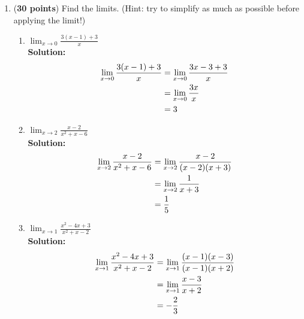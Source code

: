 \documentclass[a4paper]{article}
\begin{document}
\begin{enumerate}
\item (\textbf{30 points}) Find the limits. (Hint: try to simplify as much as possible before applying the limit!)

\begin{enumerate}
	\item $\lim_{x \to 0} \frac{3(x-1)+3}{x}$\\
	
	\textbf{Solution:}\\
	
\begin{align*}
	\lim_{x \to 0} \frac{3(x-1)+3}{x} &= \lim_{x \to 0} \frac{3x-3+3}{x}\notag\\
	&= \lim_{x \to 0} \frac{3x}{x}\notag\\
	&= 3\notag
\end{align*}	
	
	\item $\lim_{x \to 2} \frac{x-2}{x^2+x-6}$\\
	
	\textbf{Solution:}\\
	
\begin{align*}
	\lim_{x \to 2} \frac{x-2}{x^2+x-6} &= \lim_{x \to 2} \frac{x-2}{(x-2)(x+3)}\notag\\
	&= \lim_{x \to 2} \frac{1}{x+3}\notag\\
	&= \frac{1}{5}\notag
\end{align*}		
	
	
	\item $\lim_{x \to 1} \frac{x^2-4x+3}{x^2+x-2}$\\
	
	\textbf{Solution:}\\
	
\begin{align*}
	\lim_{x \to 1} \frac{x^2-4x+3}{x^2+x-2} &= \lim_{x \to 1} \frac{(x-1)(x-3)}{(x-1)(x+2)}\notag\\
	&= \lim_{x \to 1} \frac{x-3}{x+2}\notag\\
	&= -\frac{2}{3}\notag
\end{align*}	
	
\end{enumerate}


\end{enumerate}
\end{document}
